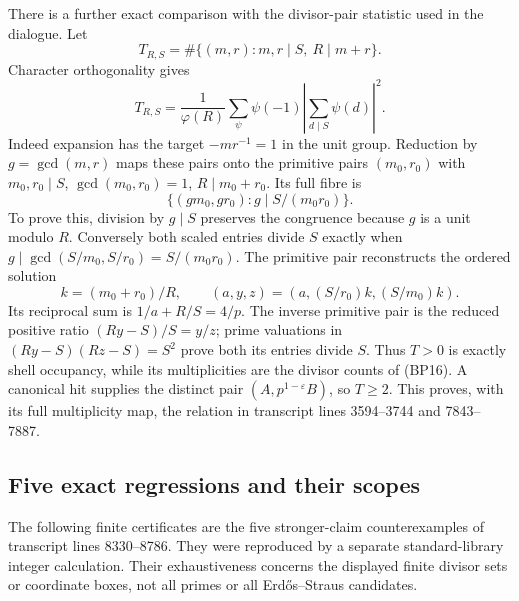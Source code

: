 There is a further exact comparison with the divisor-pair statistic
used in the dialogue. Let
\[
 T_{R,S}=\#\{(m,r):m,r\mid S,\ R\mid m+r\}.
\]
Character orthogonality gives
\[
 T_{R,S}=\frac1{\varphi(R)}\sum_\psi\psi(-1)
                  \left|\sum_{d\mid S}\psi(d)\right|^2.
 \tag{BP15}
\]
Indeed expansion has the target \(-mr^{-1}=1\) in the unit group.
Reduction by \(g=\gcd(m,r)\) maps these pairs onto the primitive
pairs \((m_0,r_0)\) with \(m_0,r_0\mid S\),
\(\gcd(m_0,r_0)=1\), \(R\mid m_0+r_0\). Its full fibre is
\[
 \{(g m_0,g r_0):g\mid S/(m_0r_0)\}.
 \tag{BP16}
\]
To prove this, division by \(g\mid S\) preserves the congruence
because \(g\) is a unit modulo \(R\). Conversely both scaled
entries divide \(S\) exactly when
\(g\mid\gcd(S/m_0,S/r_0)=S/(m_0r_0)\). The primitive pair
reconstructs the ordered solution
\[
 k=(m_0+r_0)/R,\qquad
 (a,y,z)=(a,(S/r_0)k,(S/m_0)k).
\]
Its reciprocal sum is \(1/a+R/S=4/p\). The inverse primitive
pair is the reduced positive ratio \((Ry-S)/S=y/z\); prime
valuations in \((Ry-S)(Rz-S)=S^2\) prove both its entries
divide \(S\). Thus \(T>0\) is exactly shell occupancy, while
its multiplicities are the divisor counts of (BP16). A canonical
hit supplies the distinct pair \((A,p^{1-\varepsilon}B)\),
so \(T\ge2\). This proves, with its full multiplicity map,
the relation in transcript lines 3594--3744 and 7843--7887.

\subsection{Five exact regressions and their scopes}

The following finite certificates are the five stronger-claim
counterexamples of transcript lines 8330--8786. They were reproduced
by a separate standard-library integer calculation. Their exhaustiveness
concerns the displayed finite divisor sets or coordinate boxes, not all
primes or all Erd\H{o}s--Straus candidates.

